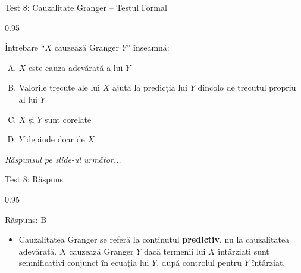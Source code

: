 \documentclass[9pt, aspectratio=169, t]{beamer}
\begin{document}
\begin{frame}{Test 8: Cauzalitate Granger -- Testul Formal}
    \begin{cminipage}{0.95\textwidth}
    \begin{alertblock}{Întrebare}
        ``$X$ cauzează Granger $Y$'' înseamnă:
    \end{alertblock}

    \vspace{0.3cm}

    \begin{enumerate}[A)]\setlength{\itemsep}{0pt}
        \item $X$ este cauza adevărată a lui $Y$
        \item Valorile trecute ale lui $X$ ajută la predicția lui $Y$ dincolo de trecutul propriu al lui $Y$
        \item $X$ și $Y$ sunt corelate
        \item $Y$ depinde doar de $X$
    \end{enumerate}

    \vspace{0.5cm}
    \begin{flushright}\textit{Răspunsul pe slide-ul următor...}\end{flushright}
    \end{cminipage}
\end{frame}

\begin{frame}{Test 8: Răspuns}
    \begin{cminipage}{0.95\textwidth}
    \begin{exampleblock}{Răspuns: B}
        \begin{itemize}\setlength{\itemsep}{0pt}
            \item Cauzalitatea Granger se referă la conținutul \textbf{predictiv}, nu la cauzalitatea adevărată. $X$ cauzează Granger $Y$ dacă termenii lui $X$ întârziați sunt semnificativi conjunct în ecuația lui $Y$, după controlul pentru $Y$ întârziat.
        \end{itemize}
    \end{exampleblock}
    \end{cminipage}
\end{frame}
\end{document}
